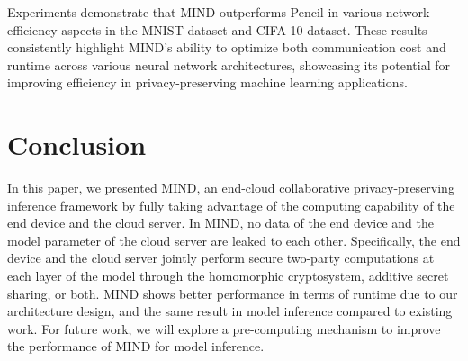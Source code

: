 \documentclass[conference]{IEEEtran}
\begin{document}
Experiments demonstrate that MIND outperforms Pencil in various network efficiency aspects in the MNIST dataset and CIFA-10 dataset. These results consistently highlight MIND's ability to optimize both communication cost and runtime across various neural network architectures, showcasing its potential for improving efficiency in privacy-preserving machine learning applications.


\section{Conclusion}
In this paper, we presented MIND, an end-cloud collaborative privacy-preserving inference framework by fully taking advantage of the computing capability of the end device and the cloud server. In MIND, no data of the end device and the model parameter of the cloud server are leaked to each other. Specifically, the end device and the cloud server jointly perform secure two-party computations at each layer of the model through the homomorphic cryptosystem, additive secret sharing, or both. MIND shows better performance in terms of runtime due to our architecture design, and the same result in model inference compared to existing work.
For future work, we will explore a pre-computing mechanism to improve the performance of MIND for model inference.




\end{document}
